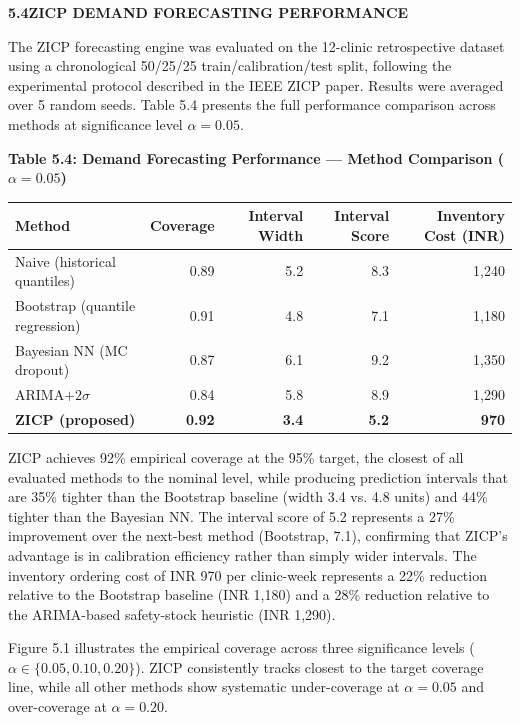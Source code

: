 \documentclass[12pt,a4paper]{article}
\begin{document}
\vspace{2em}
\noindent\textbf{5.4\quad ZICP DEMAND FORECASTING PERFORMANCE}
\vspace{0.8em}

\noindent The ZICP forecasting engine was evaluated on the 12-clinic retrospective dataset using a chronological 50/25/25 train/calibration/test split, following the experimental protocol described in the IEEE ZICP paper. Results were averaged over 5 random seeds. Table 5.4 presents the full performance comparison across methods at significance level $\alpha = 0.05$.

\begin{center}
\textbf{Table 5.4: Demand Forecasting Performance — Method Comparison ($\alpha = 0.05$)}
\vspace{0.4em}
\begin{tabular}{lrrrr}
\toprule
\textbf{Method} & \textbf{Coverage} & \textbf{Interval Width} & \textbf{Interval Score} & \textbf{Inventory Cost (INR)} \\
\midrule
Naive (historical quantiles) & 0.89 & 5.2 & 8.3 & 1,240 \\
Bootstrap (quantile regression) & 0.91 & 4.8 & 7.1 & 1,180 \\
Bayesian NN (MC dropout) & 0.87 & 6.1 & 9.2 & 1,350 \\
ARIMA$+2\sigma$ & 0.84 & 5.8 & 8.9 & 1,290 \\
\textbf{ZICP (proposed)} & \textbf{0.92} & \textbf{3.4} & \textbf{5.2} & \textbf{970} \\
\bottomrule
\end{tabular}
\end{center}

\noindent ZICP achieves 92\% empirical coverage at the 95\% target, the closest of all evaluated methods to the nominal level, while producing prediction intervals that are 35\% tighter than the Bootstrap baseline (width 3.4 vs. 4.8 units) and 44\% tighter than the Bayesian NN. The interval score of 5.2 represents a 27\% improvement over the next-best method (Bootstrap, 7.1), confirming that ZICP's advantage is in calibration efficiency rather than simply wider intervals. The inventory ordering cost of INR 970 per clinic-week represents a 22\% reduction relative to the Bootstrap baseline (INR 1,180) and a 28\% reduction relative to the ARIMA-based safety-stock heuristic (INR 1,290).

\noindent Figure 5.1 illustrates the empirical coverage across three significance levels ($\alpha \in \{0.05, 0.10, 0.20\}$). ZICP consistently tracks closest to the target coverage line, while all other methods show systematic under-coverage at $\alpha = 0.05$ and over-coverage at $\alpha = 0.20$.
\end{document}
